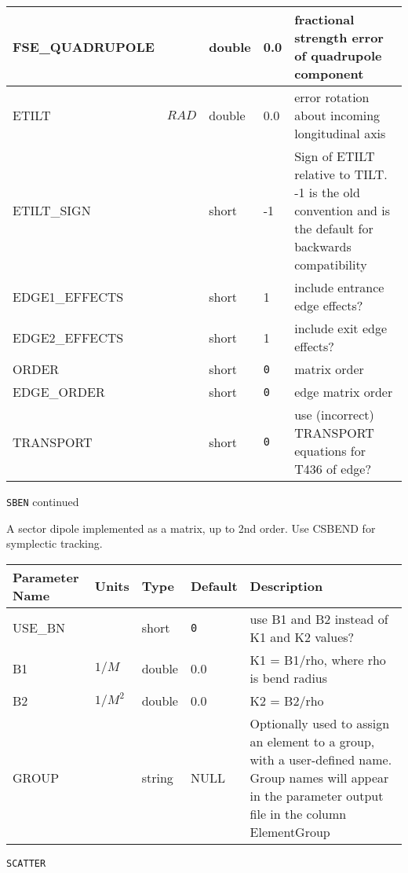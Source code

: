 \begin{tabular}{|l|l|l|l|p{\descwidth}|}
FSE\_QUADRUPOLE &  & double &  0.0 & fractional strength error of quadrupole component  \\ \hline 
ETILT & $RAD$ & double &  0.0 & error rotation about incoming longitudinal axis  \\ \hline 
ETILT\_SIGN &  & short &   -1              & Sign of ETILT relative to TILT. -1 is the old convention and is the default for backwards compatibility  \\ \hline 
EDGE1\_EFFECTS &  & short &   1               & include entrance edge effects?  \\ \hline 
EDGE2\_EFFECTS &  & short &   1               & include exit edge effects?  \\ \hline 
ORDER &  & short &  \verb|0| & matrix order  \\ \hline 
EDGE\_ORDER &  & short &  \verb|0| & edge matrix order  \\ \hline 
TRANSPORT &  & short &  \verb|0| & use (incorrect) TRANSPORT equations for T436 of edge?  \\ \hline 
\end{tabular}

\newpage
\begin{center}{\Large\verb|SBEN| continued}\end{center}
A sector dipole implemented as a matrix, up to 2nd order. Use CSBEND for symplectic tracking.
\\
\begin{tabular}{|l|l|l|l|p{\descwidth}|} \hline
Parameter Name & Units & Type & Default & Description \\ \hline 
USE\_BN &  & short &  \verb|0| & use B1 and B2 instead of K1 and K2 values?  \\ \hline 
B1 & $1/M$ & double &  0.0 & K1 = B1/rho, where rho is bend radius  \\ \hline 
B2 & $1/M^{2}$ & double &  0.0 & K2 = B2/rho  \\ \hline 
GROUP &  & string & NULL & Optionally used to assign an element to a group, with a user-defined name.  Group names will appear in the parameter output file in the column ElementGroup  \\ \hline 
\end{tabular}

\vspace*{0.5in}

\newpage
\begin{center}{\Large\verb|SCATTER|}\end{center}

